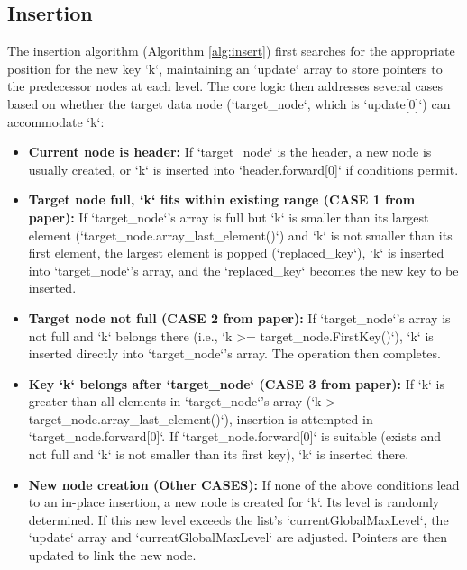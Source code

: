 \documentclass[sigconf]{acmart}
\begin{document}
\subsection{Insertion}
The insertion algorithm (Algorithm \ref{alg:insert}) first searches for the appropriate position for the new key `k`, maintaining an `update` array to store pointers to the predecessor nodes at each level. The core logic then addresses several cases based on whether the target data node (`target_node`, which is `update[0]`) can accommodate `k`:
\begin{itemize}
    \item \textbf{Current node is header:} If `target_node` is the header, a new node is usually created, or `k` is inserted into `header.forward[0]` if conditions permit.
    \item \textbf{Target node full, `k` fits within existing range (CASE 1 from paper):} If `target_node`'s array is full but `k` is smaller than its largest element (`target_node.array_last_element()`) and `k` is not smaller than its first element, the largest element is popped (`replaced_key`), `k` is inserted into `target_node`'s array, and the `replaced_key` becomes the new key to be inserted.
    \item \textbf{Target node not full (CASE 2 from paper):} If `target_node`'s array is not full and `k` belongs there (i.e., `k >= target_node.FirstKey()`), `k` is inserted directly into `target_node`'s array. The operation then completes.
    \item \textbf{Key `k` belongs after `target_node` (CASE 3 from paper):} If `k` is greater than all elements in `target_node`'s array (`k > target_node.array_last_element()`), insertion is attempted in `target_node.forward[0]`. If `target_node.forward[0]` is suitable (exists and not full and `k` is not smaller than its first key), `k` is inserted there.
    \item \textbf{New node creation (Other CASES):} If none of the above conditions lead to an in-place insertion, a new node is created for `k`. Its level is randomly determined. If this new level exceeds the list's `currentGlobalMaxLevel`, the `update` array and `currentGlobalMaxLevel` are adjusted. Pointers are then updated to link the new node.
\end{itemize}
\end{document}
